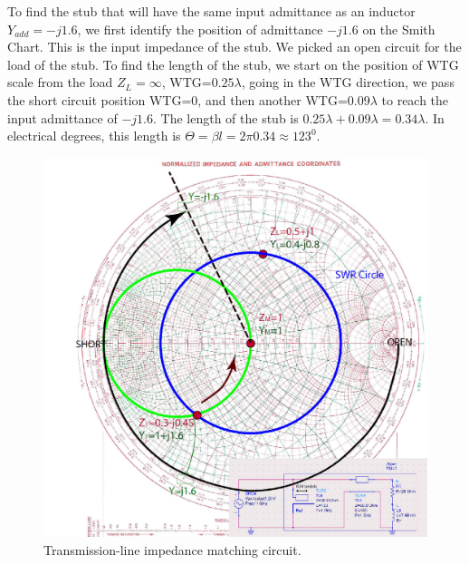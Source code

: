 \documentclass{ximera}
\begin{document}
To find the stub that will have the same input admittance as an inductor $Y_{add}=-j1.6$, we first identify the position of admittance $-j1.6$ on the Smith Chart. This is the input impedance of the stub. We picked an open circuit for the load of the stub. To find the length of the stub, we start on the position of WTG scale from the load $Z_L=\infty$, WTG=$0.25 \lambda$, going in the WTG direction, we pass the short circuit position WTG=$0$, and then another WTG=$0.09 \lambda$ to reach the input admittance of $-j1.6$. The length of the stub is $0.25 \lambda+0.09 \lambda=0.34 \lambda$. In electrical degrees, this length is $\Theta=\beta l =2 \pi 0.34 \approx 123^0$.




\begin{figure}[htbp]
\begin{center}
\includegraphics[scale=1]{../jpg/MatchTL-01.jpg}
\end{center}
\caption{Transmission-line impedance matching circuit.}
\label{fig:TransLineImpM}
\end{figure}
\end{document}
